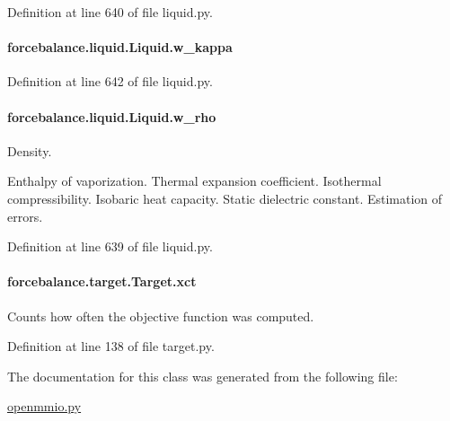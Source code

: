Definition at line 640 of file liquid.\-py.

\hypertarget{classforcebalance_1_1liquid_1_1Liquid_a6b262d9343247a902063bf62d5f19108}{
\paragraph[{w\-\_\-kappa}]{\setlength{\rightskip}{0pt plus 5cm}forcebalance.\-liquid.\-Liquid.\-w\-\_\-kappa\hspace{0.3cm}{\ttfamily [inherited]}}}\label{classforcebalance_1_1liquid_1_1Liquid_a6b262d9343247a902063bf62d5f19108}


Definition at line 642 of file liquid.\-py.

\hypertarget{classforcebalance_1_1liquid_1_1Liquid_aef8ad1dda086bde6f48130d273af9784}{
\paragraph[{w\-\_\-rho}]{\setlength{\rightskip}{0pt plus 5cm}forcebalance.\-liquid.\-Liquid.\-w\-\_\-rho\hspace{0.3cm}{\ttfamily [inherited]}}}\label{classforcebalance_1_1liquid_1_1Liquid_aef8ad1dda086bde6f48130d273af9784}


Density. 

Enthalpy of vaporization. Thermal expansion coefficient. Isothermal compressibility. Isobaric heat capacity. Static dielectric constant. Estimation of errors. 

Definition at line 639 of file liquid.\-py.

\hypertarget{classforcebalance_1_1target_1_1Target_aad2e385cfbf7b4a68f1c2cb41133fe82}{
\paragraph[{xct}]{\setlength{\rightskip}{0pt plus 5cm}forcebalance.\-target.\-Target.\-xct\hspace{0.3cm}{\ttfamily [inherited]}}}\label{classforcebalance_1_1target_1_1Target_aad2e385cfbf7b4a68f1c2cb41133fe82}


Counts how often the objective function was computed. 



Definition at line 138 of file target.\-py.



The documentation for this class was generated from the following file\-:\begin{DoxyCompactItemize}
\item 
\hyperlink{openmmio_8py}{openmmio.\-py}\end{DoxyCompactItemize}
